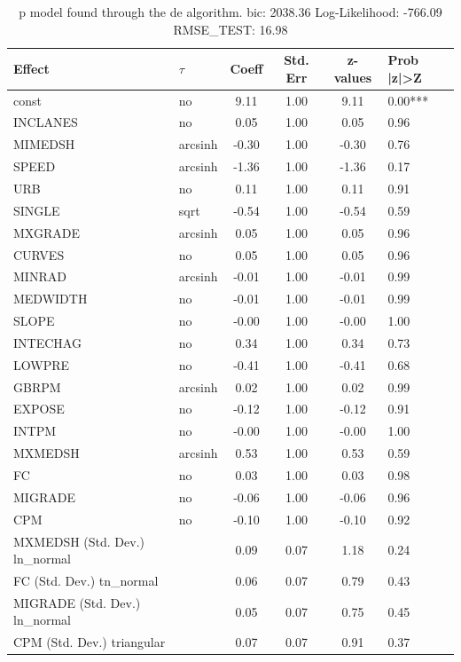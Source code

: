 \begin{table}
	\caption{p model found through the de algorithm. bic: 2038.36 Log-Likelihood: -766.09 RMSE_TEST: 16.98}
	\begin{center}
		\begin{tabular}{|l|l|c|c|c|l|}
			\hline
			Effect & $\tau$ & Coeff & Std. Err & z-values & Prob |z|>Z \\
			\hline
			const & no & 9.11 & 1.00 & 9.11 & 0.00*** \\
			\hline
			INCLANES & no & 0.05 & 1.00 & 0.05 & 0.96 \\
			\hline
			MIMEDSH & arcsinh & -0.30 & 1.00 & -0.30 & 0.76 \\
			\hline
			SPEED & arcsinh & -1.36 & 1.00 & -1.36 & 0.17 \\
			\hline
			URB & no & 0.11 & 1.00 & 0.11 & 0.91 \\
			\hline
			SINGLE & sqrt & -0.54 & 1.00 & -0.54 & 0.59 \\
			\hline
			MXGRADE & arcsinh & 0.05 & 1.00 & 0.05 & 0.96 \\
			\hline
			CURVES & no & 0.05 & 1.00 & 0.05 & 0.96 \\
			\hline
			MINRAD & arcsinh & -0.01 & 1.00 & -0.01 & 0.99 \\
			\hline
			MEDWIDTH & no & -0.01 & 1.00 & -0.01 & 0.99 \\
			\hline
			SLOPE & no & -0.00 & 1.00 & -0.00 & 1.00 \\
			\hline
			INTECHAG & no & 0.34 & 1.00 & 0.34 & 0.73 \\
			\hline
			LOWPRE & no & -0.41 & 1.00 & -0.41 & 0.68 \\
			\hline
			GBRPM & arcsinh & 0.02 & 1.00 & 0.02 & 0.99 \\
			\hline
			EXPOSE & no & -0.12 & 1.00 & -0.12 & 0.91 \\
			\hline
			INTPM & no & -0.00 & 1.00 & -0.00 & 1.00 \\
			\hline
			MXMEDSH & arcsinh & 0.53 & 1.00 & 0.53 & 0.59 \\
			\hline
			FC & no & 0.03 & 1.00 & 0.03 & 0.98 \\
			\hline
			MIGRADE & no & -0.06 & 1.00 & -0.06 & 0.96 \\
			\hline
			CPM & no & -0.10 & 1.00 & -0.10 & 0.92 \\
			\hline
			MXMEDSH (Std. Dev.) ln_normal &  & 0.09 & 0.07 & 1.18 & 0.24 \\
			\hline
			FC (Std. Dev.) tn_normal &  & 0.06 & 0.07 & 0.79 & 0.43 \\
			\hline
			MIGRADE (Std. Dev.) ln_normal &  & 0.05 & 0.07 & 0.75 & 0.45 \\
			\hline
			CPM (Std. Dev.) triangular &  & 0.07 & 0.07 & 0.91 & 0.37 \\
			\hline
		\end{tabular}
	\end{center}
\end{table}